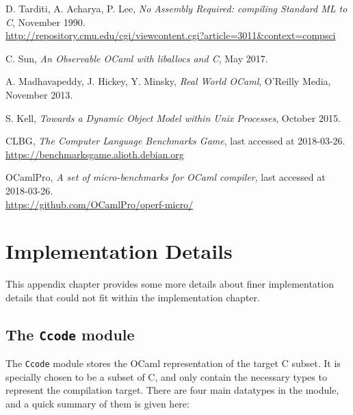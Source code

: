 \documentclass[12pt,a4paper,twoside,openright]{report}
\begin{document}

\begin{thebibliography}{9}

D. Tarditi, A. Acharya, P. Lee,
\textit{No Assembly Required: compiling Standard ML to C},
November 1990.\\
\url{http://repository.cmu.edu/cgi/viewcontent.cgi?article=3011&context=compsci}

C. Sun,
\textit{An Observable OCaml with liballocs and C},
May 2017.

A. Madhavapeddy, J. Hickey, Y. Minsky,
\textit{Real World OCaml},
O'Reilly Media,
November 2013.

S. Kell,
\textit{Towards a Dynamic Object Model within Unix Processes},
October 2015.

CLBG,
\textit{The Computer Language Benchmarks Game},
last accessed at 2018-03-26.\\
\url{https://benchmarksgame.alioth.debian.org}

OCamlPro,
\textit{A set of micro-benchmarks for OCaml compiler},
last accessed at 2018-03-26.\\
\url{https://github.com/OCamlPro/operf-micro/}

\end{thebibliography}

\appendix

\chapter{Implementation Details}

This appendix chapter provides some more details about finer implementation
details that could not fit within the implementation chapter.

\section{The \texttt{Ccode} module} \label{ccode}

The \texttt{Ccode} module stores the OCaml representation of the target C
subset. It is specially chosen to be a subset of C, and only contain the
necessary types to represent the compilation target. There are four main
datatypes in the module, and a quick summary of them is given here:
\end{document}
